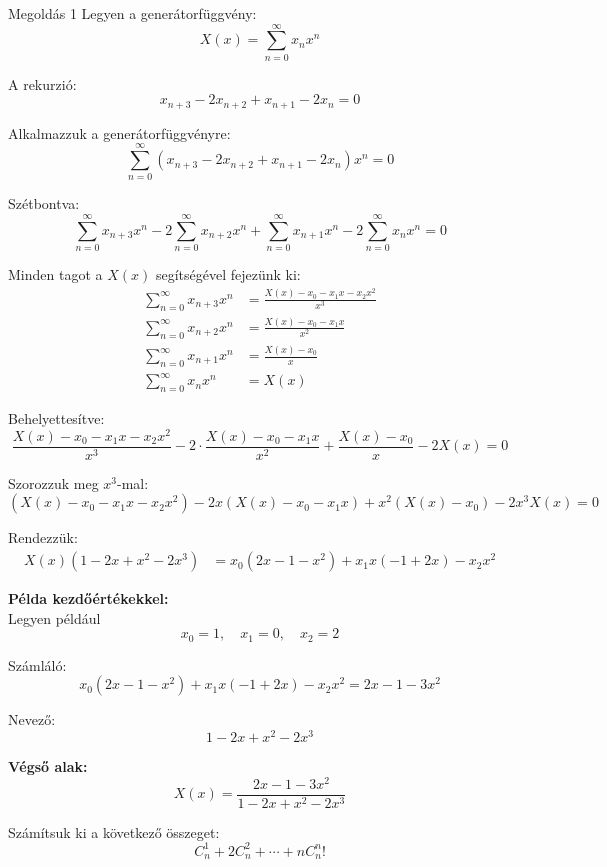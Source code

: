 \begin{solution}
Megoldás 1 Legyen a generátorfüggvény: 
\[
X(x)=\sum_{n=0}^{\infty}x_{n}x^{n}
\]

A rekurzió: 
\[
x_{n+3}-2x_{n+2}+x_{n+1}-2x_{n}=0
\]

Alkalmazzuk a generátorfüggvényre: 
\[
\sum_{n=0}^{\infty}(x_{n+3}-2x_{n+2}+x_{n+1}-2x_{n})x^{n}=0
\]

Szétbontva: 
\[
\sum_{n=0}^{\infty}x_{n+3}x^{n}-2\sum_{n=0}^{\infty}x_{n+2}x^{n}+\sum_{n=0}^{\infty}x_{n+1}x^{n}-2\sum_{n=0}^{\infty}x_{n}x^{n}=0
\]

Minden tagot a $X(x)$ segítségével fejezünk ki: 
\begin{align*}
\sum_{n=0}^{\infty}x_{n+3}x^{n} & =\frac{X(x)-x_{0}-x_{1}x-x_{2}x^{2}}{x^{3}}\\
\sum_{n=0}^{\infty}x_{n+2}x^{n} & =\frac{X(x)-x_{0}-x_{1}x}{x^{2}}\\
\sum_{n=0}^{\infty}x_{n+1}x^{n} & =\frac{X(x)-x_{0}}{x}\\
\sum_{n=0}^{\infty}x_{n}x^{n} & =X(x)
\end{align*}

Behelyettesítve: 
\[
\frac{X(x)-x_{0}-x_{1}x-x_{2}x^{2}}{x^{3}}-2\cdot\frac{X(x)-x_{0}-x_{1}x}{x^{2}}+\frac{X(x)-x_{0}}{x}-2X(x)=0
\]

Szorozzuk meg $x^{3}$-mal: 
\[
(X(x)-x_{0}-x_{1}x-x_{2}x^{2})-2x(X(x)-x_{0}-x_{1}x)+x^{2}(X(x)-x_{0})-2x^{3}X(x)=0
\]

Rendezzük: 
\begin{align*}
X(x)(1-2x+x^{2}-2x^{3}) & =x_{0}(2x-1-x^{2})+x_{1}x(-1+2x)-x_{2}x^{2}
\end{align*}

\textbf{Példa kezdőértékekkel:}\\

Legyen például
\[
x_{0}=1,\quad x_{1}=0,\quad x_{2}=2
\]

Számláló: 
\[
x_{0}(2x-1-x^{2})+x_{1}x(-1+2x)-x_{2}x^{2}=2x-1-3x^{2}
\]

Nevező: 
\[
1-2x+x^{2}-2x^{3}
\]

\textbf{Végső alak:}\\

\[
\boxed{X(x)=\frac{2x-1-3x^{2}}{1-2x+x^{2}-2x^{3}}}
\]
\end{solution}
\begin{extraproblem}
Számítsuk ki a következő összeget: 
\[
C_{n}^{1}+2C_{n}^{2}+\cdots+nC_{n}^{n}!
\]
\end{extraproblem}

